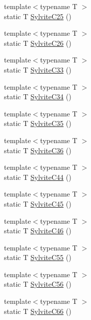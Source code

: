 \begin{DoxyCompactItemize}
{\footnotesize template$<$typename T $>$ }\\static T \mbox{\hyperlink{namespacempc_1_1data_ab162d0a13b908a0695b073ed92052ffe}{Sylvite\+C25}} ()
\item 
{\footnotesize template$<$typename T $>$ }\\static T \mbox{\hyperlink{namespacempc_1_1data_ac6a64dd34a6cf65e236f21077524695f}{Sylvite\+C26}} ()
\item 
{\footnotesize template$<$typename T $>$ }\\static T \mbox{\hyperlink{namespacempc_1_1data_a2a6ff2d23de7e004189693c7fb3bc998}{Sylvite\+C33}} ()
\item 
{\footnotesize template$<$typename T $>$ }\\static T \mbox{\hyperlink{namespacempc_1_1data_aa3385c3989f1507bec63c6e87b4a59be}{Sylvite\+C34}} ()
\item 
{\footnotesize template$<$typename T $>$ }\\static T \mbox{\hyperlink{namespacempc_1_1data_ab2519e175678176b1cd4333711a0282e}{Sylvite\+C35}} ()
\item 
{\footnotesize template$<$typename T $>$ }\\static T \mbox{\hyperlink{namespacempc_1_1data_ac7d0dff453d02b93774cc9655423c962}{Sylvite\+C36}} ()
\item 
{\footnotesize template$<$typename T $>$ }\\static T \mbox{\hyperlink{namespacempc_1_1data_a24fa19baefce0ba12b6856079f9dcc2a}{Sylvite\+C44}} ()
\item 
{\footnotesize template$<$typename T $>$ }\\static T \mbox{\hyperlink{namespacempc_1_1data_a3784add159932b48e09f6b615c1406b4}{Sylvite\+C45}} ()
\item 
{\footnotesize template$<$typename T $>$ }\\static T \mbox{\hyperlink{namespacempc_1_1data_a1b1ef8d34daa83be5186110cb9b8b6d4}{Sylvite\+C46}} ()
\item 
{\footnotesize template$<$typename T $>$ }\\static T \mbox{\hyperlink{namespacempc_1_1data_a0e06a90eedd391b55178eb11c16a5016}{Sylvite\+C55}} ()
\item 
{\footnotesize template$<$typename T $>$ }\\static T \mbox{\hyperlink{namespacempc_1_1data_a611647f3789205e29c25bd049fe00e90}{Sylvite\+C56}} ()
\item 
{\footnotesize template$<$typename T $>$ }\\static T \mbox{\hyperlink{namespacempc_1_1data_aaa2ddbe02c171ac56104d8f2ee4b522d}{Sylvite\+C66}} ()

\end{DoxyCompactItemize}
